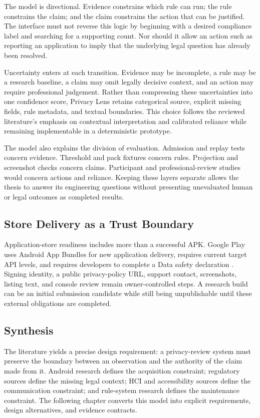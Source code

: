 The model is directional. Evidence constrains which rule can run; the rule constrains the claim; and the claim constrains the action that can be justified. The interface must not reverse this logic by beginning with a desired compliance label and searching for a supporting count. Nor should it allow an action such as reporting an application to imply that the underlying legal question has already been resolved.

Uncertainty enters at each transition. Evidence may be incomplete, a rule may be a research baseline, a claim may omit legally decisive context, and an action may require professional judgement. Rather than compressing these uncertainties into one confidence score, Privacy Lens retains categorical source, explicit missing fields, rule metadata, and textual boundaries. This choice follows the reviewed literature's emphasis on contextual interpretation and calibrated reliance while remaining implementable in a deterministic prototype.

The model also explains the division of evaluation. Admission and replay tests concern evidence. Threshold and pack fixtures concern rules. Projection and screenshot checks concern claims. Participant and professional-review studies would concern actions and reliance. Keeping these layers separate allows the thesis to answer its engineering questions without presenting unevaluated human or legal outcomes as completed results.

\subsection{Store Delivery as a Trust Boundary}

Application-store readiness includes more than a successful APK. Google Play uses Android App Bundles for new application delivery, requires current target API levels, and requires developers to complete a Data safety declaration \cite{androidbundle2026,playtarget2026,playdatasafety2026}. Signing identity, a public privacy-policy URL, support contact, screenshots, listing text, and console review remain owner-controlled steps. A research build can be an initial submission candidate while still being unpublishable until these external obligations are completed.

\subsection{Synthesis}

The literature yields a precise design requirement: a privacy-review system must preserve the boundary between an observation and the authority of the claim made from it. Android research defines the acquisition constraint; regulatory sources define the missing legal context; HCI and accessibility sources define the communication constraint; and rule-system research defines the maintenance constraint. The following chapter converts this model into explicit requirements, design alternatives, and evidence contracts.
